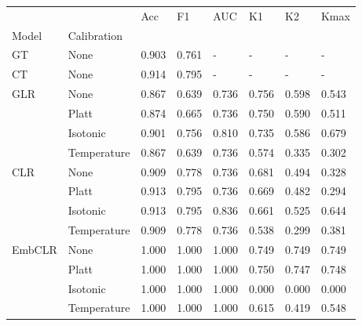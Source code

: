 \begin{tabular}{llllllll}
\toprule
 &  & Acc & F1 & AUC & K1 & K2 & Kmax \\
Model & Calibration &  &  &  &  &  &  \\
\midrule
GT & None & 0.903 & 0.761 & - & - & - & - \\
\cline{1-8}
CT & None & 0.914 & 0.795 & - & - & - & - \\
\cline{1-8}
\multirow[t]{4}{*}{GLR} & None & 0.867 & 0.639 & 0.736 & 0.756 & 0.598 & 0.543 \\
 & Platt & 0.874 & 0.665 & 0.736 & 0.750 & 0.590 & 0.511 \\
 & Isotonic & 0.901 & 0.756 & 0.810 & 0.735 & 0.586 & 0.679 \\
 & Temperature & 0.867 & 0.639 & 0.736 & 0.574 & 0.335 & 0.302 \\
\cline{1-8}
\multirow[t]{4}{*}{CLR} & None & 0.909 & 0.778 & 0.736 & 0.681 & 0.494 & 0.328 \\
 & Platt & 0.913 & 0.795 & 0.736 & 0.669 & 0.482 & 0.294 \\
 & Isotonic & 0.913 & 0.795 & 0.836 & 0.661 & 0.525 & 0.644 \\
 & Temperature & 0.909 & 0.778 & 0.736 & 0.538 & 0.299 & 0.381 \\
\cline{1-8}
\multirow[t]{4}{*}{EmbCLR} & None & 1.000 & 1.000 & 1.000 & 0.749 & 0.749 & 0.749 \\
 & Platt & 1.000 & 1.000 & 1.000 & 0.750 & 0.747 & 0.748 \\
 & Isotonic & 1.000 & 1.000 & 1.000 & 0.000 & 0.000 & 0.000 \\
 & Temperature & 1.000 & 1.000 & 1.000 & 0.615 & 0.419 & 0.548 \\
\cline{1-8}
\bottomrule
\end{tabular}
